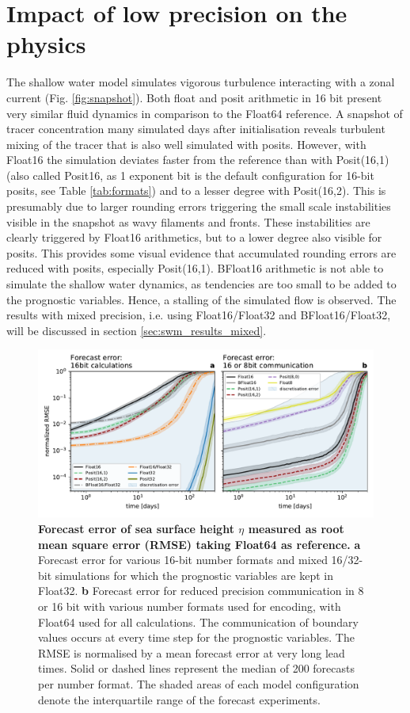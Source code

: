 \section{Impact of low precision on the physics}
\label{sec:swm_physics}

The shallow water model simulates vigorous turbulence interacting with a zonal current (Fig. \ref{fig:snapshot}). Both float and
posit arithmetic in 16 bit present very similar fluid dynamics in comparison to the Float64 reference. A snapshot of tracer
concentration many simulated days after initialisation reveals turbulent mixing of the tracer that is also well simulated with posits.
However, with Float16 the simulation deviates faster from the reference than with Posit(16,1) (also called Posit16, as 1 exponent
bit is the default configuration for 16-bit posits, see Table \ref{tab:formats}) and to a lesser degree with Posit(16,2).
This is  presumably due to larger rounding errors triggering the small scale instabilities visible in the snapshot as wavy
filaments and fronts. These instabilities are clearly triggered by Float16 arithmetics, but to a lower degree also visible for posits.
This provides some visual evidence that accumulated rounding errors are reduced with posits, especially Posit(16,1). BFloat16
arithmetic is not able to simulate the shallow water dynamics, as tendencies are too small to be added to the prognostic variables. 
Hence, a stalling of the simulated flow is observed. The results with mixed precision, i.e. using Float16/Float32 and BFloat16/Float32,
will be discussed in section \ref{sec:swm_results_mixed}.

\begin{figure}
\includegraphics[width=1\textwidth]{Figures/swm/rmse_eta_darker.pdf}
\caption{\textbf{Forecast error of sea surface height $\eta$ measured as root mean square error (RMSE) taking Float64 as reference.}
\textbf{a} Forecast error for various 16-bit number formats and mixed 16/32-bit simulations for which the prognostic variables
are kept in Float32. \textbf{b} Forecast error for reduced precision communication in 8 or 16 bit with various number formats used
for encoding, with Float64 used for all calculations. The communication of boundary values occurs at every time step
for the prognostic variables. The RMSE is normalised by a mean forecast error at very long lead times. Solid or dashed lines represent
the median of 200 forecasts per number format. The shaded areas of each model configuration denote the interquartile
range of the forecast experiments.}
\label{fig:rmse}
\end{figure}

